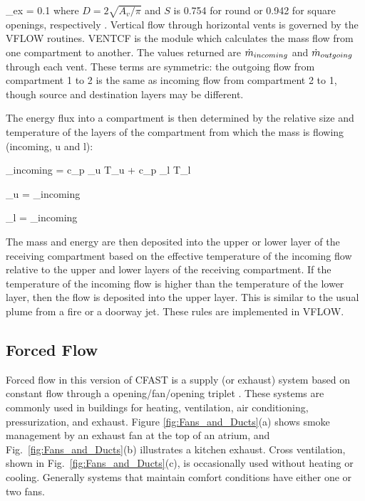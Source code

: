 \be \dm_{ex} = 0.1   \ee
where $D = 2 \sqrt{A_v / \pi}$ and $S$ is 0.754 for round or 0.942 for square openings, respectively \cite{Cooper:1989}. Vertical flow through horizontal vents is governed by the VFLOW routines. VENTCF is the module which calculates the mass flow from one compartment to another. The values returned are $\dot{m}_{incoming}$ and $\dot{m}_{outgoing}$ through each vent. These terms are symmetric: the outgoing flow from compartment 1 to 2 is the same as incoming flow from compartment 2 to 1, though source and destination layers may be different.

The energy flux into a compartment is then determined by the relative size and temperature of the layers of the compartment from which the mass is flowing (incoming, u and l):

\be \dq_{incoming} = c_p \dm_u T_u + c_p \dm_l T_l \ee

\be \dm_u = \dm_{incoming}  \ee

\be \dm_l = \dm_{incoming}  \ee


The mass and energy are then deposited into the upper or lower layer of the receiving compartment based on the effective temperature of the incoming flow relative to the upper and lower layers of the receiving compartment. If the temperature of the incoming flow is higher than the temperature of the lower layer, then the flow is deposited into the upper layer. This is similar to the usual plume from a fire or a doorway jet. These rules are implemented in VFLOW.

\subsection{Forced Flow}

Forced flow in this version of CFAST is a supply (or exhaust) system based on constant flow through a opening/fan/opening triplet . These systems are commonly used in buildings for heating, ventilation, air conditioning, pressurization, and exhaust. Figure \ref{fig:Fans_and_Ducts}(a) shows smoke management by an exhaust fan at the top of an atrium, and Fig.~\ref{fig:Fans_and_Ducts}(b) illustrates a kitchen exhaust.  Cross ventilation, shown in Fig.~\ref{fig:Fans_and_Ducts}(c), is occasionally used without heating or cooling.  Generally systems that maintain comfort conditions have either one or two fans.

